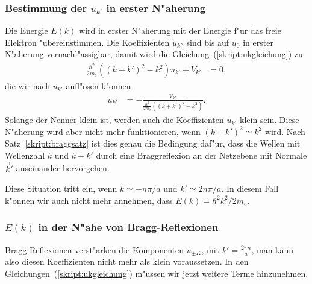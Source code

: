 \subsubsection{Bestimmung der $u_{k'}$ in erster N"aherung}
Die Energie $E(k)$ wird in erster N"aherung mit der Energie f"ur das
freie Elektron "ubereinstimmen.
Die Koeffizienten $u_{k''}$ sind bis auf $u_0$ in erster N"aherung
vernachl"assigbar, damit wird die Gleichung~(\ref{skript:ukgleichung})
zu
\begin{align*}
\frac{\hbar^2}{2m_e}((k+k')^2 -k^2)
u_{k'}
+
V_{k'}
&=
0,
\end{align*}
die wir nach $u_{k'}$ aufl"osen k"onnen
\begin{align*}
u_{k'}
&=
-
\frac{\displaystyle V_{k'}}{
\displaystyle
\frac{\hbar^2}{2m_e}((k+k')^2 -k^2)
}.
\end{align*}
Solange der Nenner klein ist, werden auch die Koeffizienten $u_{k'}$
klein sein.
Diese N"aherung wird aber nicht mehr funktionieren, wenn $(k+k')^2\simeq k^2$
wird.
Nach Satz~\ref{skript:braggsatz} ist dies genau die Bedingung daf"ur,
dass die Wellen mit Wellenzahl $k$ und $k+k'$ durch eine Braggreflexion
an der Netzebene mit Normale $\vec k'$ auseinander hervorgehen.

Diese Situation tritt ein, wenn $k\simeq -n\pi/a$ und $k'\simeq 2n\pi/a$.
In diesem Fall k"onnen wir auch nicht mehr annehmen,
dass $E(k)=\hbar^2k^2/2m_e$.

%

\subsubsection{$E(k)$ in der N"ahe von Bragg-Reflexionen}
Bragg-Reflexionen verst"arken die Komponenten $u_{\pm K}$,
mit $k'=\frac{2\pi n}a$, man kann also diesen Koeffizienten nicht mehr
als klein voraussetzen.
In den Gleichungen~(\ref{skript:ukgleichung}) m"ussen wir jetzt weitere
Terme hinzunehmen.

